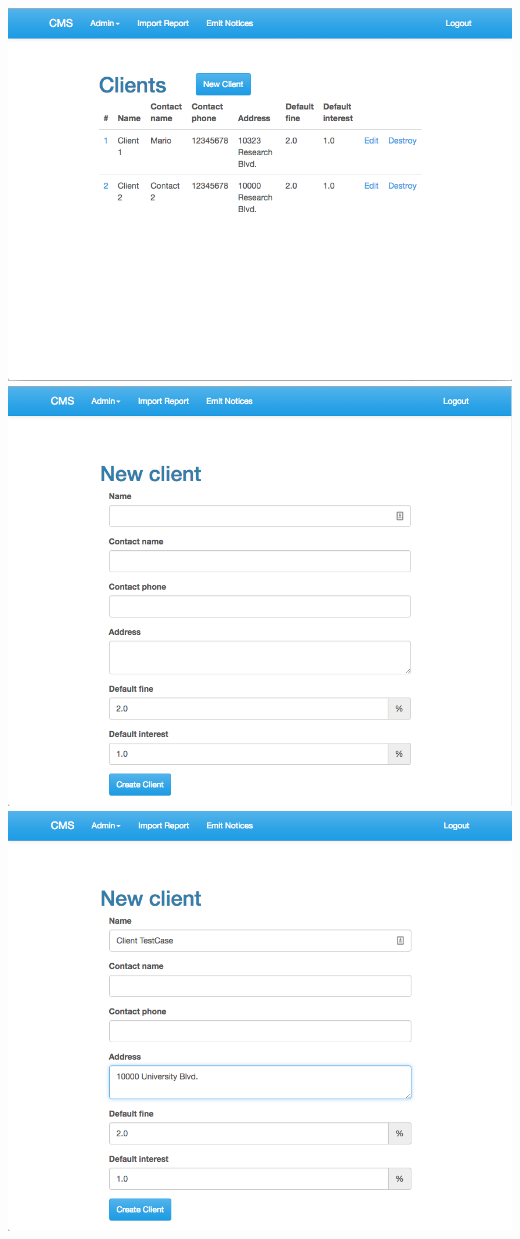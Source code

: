 \begin{itemize}
    \includegraphics[scale=0.25]{./images/ss/client/create/2.png}\\
    \includegraphics[scale=0.25]{./images/ss/client/create/3.png}
    \includegraphics[scale=0.25]{./images/ss/client/create/4.png}\\

\end{itemize}
